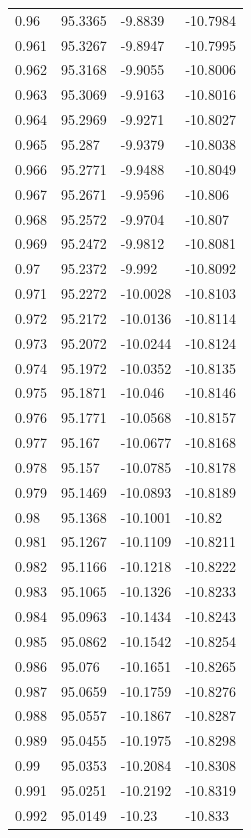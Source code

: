 \begin{tabular}{llll}
0.96 & 95.3365 & -9.8839 & -10.7984 \\
0.961 & 95.3267 & -9.8947 & -10.7995 \\
0.962 & 95.3168 & -9.9055 & -10.8006 \\
0.963 & 95.3069 & -9.9163 & -10.8016 \\
0.964 & 95.2969 & -9.9271 & -10.8027 \\
0.965 & 95.287 & -9.9379 & -10.8038 \\
0.966 & 95.2771 & -9.9488 & -10.8049 \\
0.967 & 95.2671 & -9.9596 & -10.806 \\
0.968 & 95.2572 & -9.9704 & -10.807 \\
0.969 & 95.2472 & -9.9812 & -10.8081 \\
0.97 & 95.2372 & -9.992 & -10.8092 \\
0.971 & 95.2272 & -10.0028 & -10.8103 \\
0.972 & 95.2172 & -10.0136 & -10.8114 \\
0.973 & 95.2072 & -10.0244 & -10.8124 \\
0.974 & 95.1972 & -10.0352 & -10.8135 \\
0.975 & 95.1871 & -10.046 & -10.8146 \\
0.976 & 95.1771 & -10.0568 & -10.8157 \\
0.977 & 95.167 & -10.0677 & -10.8168 \\
0.978 & 95.157 & -10.0785 & -10.8178 \\
0.979 & 95.1469 & -10.0893 & -10.8189 \\
0.98 & 95.1368 & -10.1001 & -10.82 \\
0.981 & 95.1267 & -10.1109 & -10.8211 \\
0.982 & 95.1166 & -10.1218 & -10.8222 \\
0.983 & 95.1065 & -10.1326 & -10.8233 \\
0.984 & 95.0963 & -10.1434 & -10.8243 \\
0.985 & 95.0862 & -10.1542 & -10.8254 \\
0.986 & 95.076 & -10.1651 & -10.8265 \\
0.987 & 95.0659 & -10.1759 & -10.8276 \\
0.988 & 95.0557 & -10.1867 & -10.8287 \\
0.989 & 95.0455 & -10.1975 & -10.8298 \\
0.99 & 95.0353 & -10.2084 & -10.8308 \\
0.991 & 95.0251 & -10.2192 & -10.8319 \\
0.992 & 95.0149 & -10.23 & -10.833 \\

\end{tabular}
